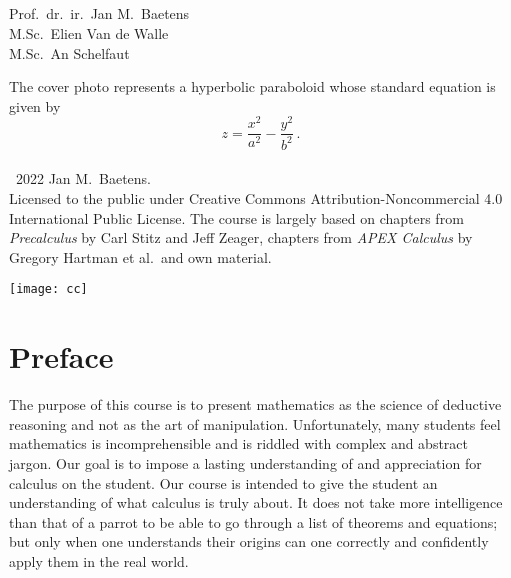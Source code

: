 \thispagestyle{empty}
\cleardoublepage
\thispagestyle{empty}
\begin{titlepage}
\begin{center}
\vspace{5cm}
\HRule \\[1cm]
\\[.7cm]\fi
{}\\[.7cm]\fi
\HRule \\[3cm]
\end{center}

\begin{center}
{\Large Prof.\ dr.\ ir.\ Jan M.\ Baetens\\
\Large M.Sc.\ Elien Van de Walle\\
\Large M.Sc.\ An Schelfaut}\\[9cm]
\vfill
\end{center}
\end{titlepage}
\thispagestyle{empty}
\vspace*{4cm}
The cover photo represents a hyperbolic paraboloid whose standard equation is given by
$$
z=\dfrac{x^2}{a^2}-\dfrac{y^2}{b^2}\,.
$$
\\[14cm]
\textcopyright\, 2022 Jan M.\ Baetens.\\
 Licensed to the public under Creative Commons Attribution-Noncommercial 4.0 International Public License. The course is largely based on  chapters from \textit{Precalculus} by Carl Stitz and Jeff Zeager, chapters from \textit{APEX Calculus} by Gregory Hartman et al.\  and own material. 
 	\begin{flushleft}
			\texttt{[image: cc]}
	\end{flushleft}

\chapter*{Preface}
The purpose of this course is to present mathematics as the science of deductive reasoning and not as the art of manipulation. Unfortunately, many students feel mathematics is incomprehensible and is riddled with complex and abstract jargon. Our goal is to impose a lasting understanding of and appreciation for calculus on the student.  Our course is intended to give the student an understanding of what calculus is truly about. It does not take more intelligence than that of a parrot to be able to go through a list of theorems and equations; but only when one understands their origins can one correctly and confidently apply them in the real world. 

